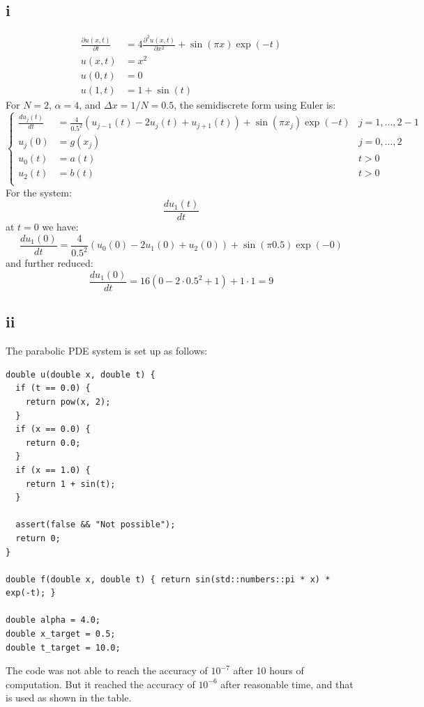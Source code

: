 \documentclass{article}
\begin{document}
\subsection*{i}
$$
\begin{aligned}
  \frac{\partial u(x,t)}{\partial t} &= 4\frac{\partial^2u(x,t)}{\partial x^2}+\sin{(\pi x)\exp{(-t)}}\\
  u(x,t)&=x^2\\
  u(0,t)&=0\\
  u(1,t)&=1+\sin{(t)}
\end{aligned}
$$
For $N=2$, $\alpha=4$, and $\Delta x=1/N=0.5$, the semidiscrete form using Euler is:
$$
\left\{
\begin{aligned}
  \frac{d u_j(t)}{dt}&=\frac{4}{0.5^2}(u_{j-1}(t)-2u_{j}(t)+u_{j+1}(t))+\sin(\pi x_j)\exp{(-t)}&j=1,\dots,2-1\\
  u_j(0)&=g(x_j) &j=0,\dots,2\\
  u_0(t)&=a(t)&t>0\\
  u_2(t)&=b(t)&t>0\\
\end{aligned}
\right.
$$
For the system:
$$\frac{du_1(t)}{dt}$$
at $t=0$ we have:
$$
\frac{d u_1(0)}{dt}=\frac{4}{0.5^2}(u_0(0)-2u_1(0)+u_2(0))+\sin(\pi 0.5)\exp{(-0)}
$$
and further reduced:
$$
\frac{d u_1(0)}{dt}=16(0-2\cdot 0.5^2+1)+1\cdot 1=9
$$

\subsection*{ii}
The parabolic PDE system is set up as follows:
\begin{verbatim}
double u(double x, double t) {
  if (t == 0.0) {
    return pow(x, 2);
  }
  if (x == 0.0) {
    return 0.0;
  }
  if (x == 1.0) {
    return 1 + sin(t);
  }

  assert(false && "Not possible");
  return 0;
}

double f(double x, double t) { return sin(std::numbers::pi * x) * exp(-t); }

double alpha = 4.0;
double x_target = 0.5;
double t_target = 10.0;
\end{verbatim}

The code was not able to reach the accuracy of $10^{-7}$ after 10 hours of computation.
But it reached the accuracy of $10^{-6}$ after reasonable time, and that is used as shown in the table.
\end{document}
